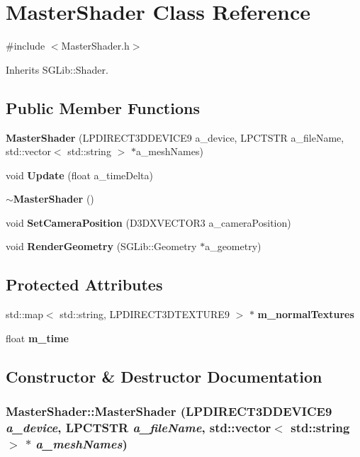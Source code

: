 \section{MasterShader Class Reference}
\label{class_master_shader}


{\ttfamily \#include $<$MasterShader.h$>$}

Inherits SGLib::Shader.\subsection*{Public Member Functions}
\begin{DoxyCompactItemize}
\item 
{\bf MasterShader} (LPDIRECT3DDEVICE9 a\_\-device, LPCTSTR a\_\-fileName, std::vector$<$ std::string $>$ $\ast$a\_\-meshNames)
\item 
void {\bf Update} (float a\_\-timeDelta)
\item 
{\bf $\sim$MasterShader} ()
\item 
void {\bf SetCameraPosition} (D3DXVECTOR3 a\_\-cameraPosition)
\item 
void {\bf RenderGeometry} (SGLib::Geometry $\ast$a\_\-geometry)
\end{DoxyCompactItemize}
\subsection*{Protected Attributes}
\begin{DoxyCompactItemize}
\item 
std::map$<$ std::string, LPDIRECT3DTEXTURE9 $>$ $\ast$ {\bf m\_\-normalTextures}
\item 
float {\bf m\_\-time}
\end{DoxyCompactItemize}


\subsection{Constructor \& Destructor Documentation}
\subsubsection[{MasterShader}]{\setlength{\rightskip}{0pt plus 5cm}MasterShader::MasterShader (LPDIRECT3DDEVICE9 {\em a\_\-device}, \/  LPCTSTR {\em a\_\-fileName}, \/  std::vector$<$ std::string $>$ $\ast$ {\em a\_\-meshNames})\hspace{0.3cm}{\ttfamily  [inline]}}\label{class_master_shader_adf8b691e77d47763fbbc44c7724fb880}
